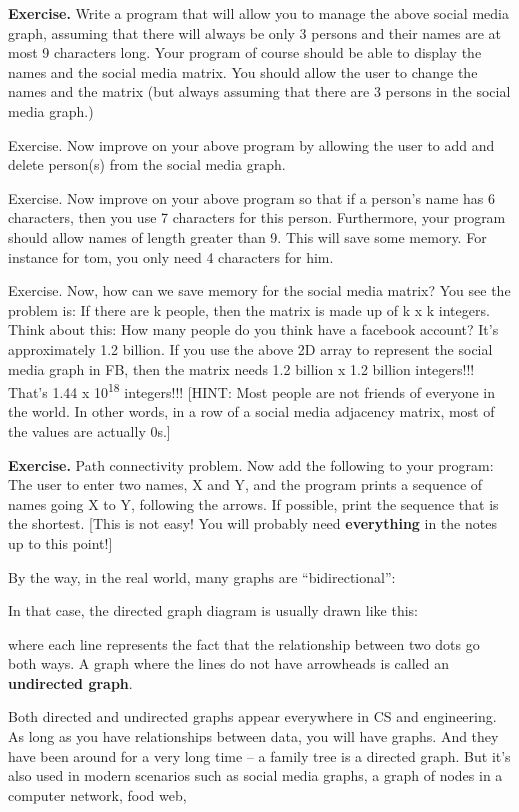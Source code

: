 \documentclass[
]{article}
\begin{document}
\textbf{Exercise.} Write a program that will allow you to manage the
above social media graph, assuming that there will always be only 3
persons and their names are at most 9 characters long. Your program of
course should be able to display the names and the social media matrix.
You should allow the user to change the names and the matrix (but always
assuming that there are 3 persons in the social media graph.)

Exercise. Now improve on your above program by allowing the user to add
and delete person(s) from the social media graph.

Exercise. Now improve on your above program so that if a person's name
has 6 characters, then you use 7 characters for this person.
Furthermore, your program should allow names of length greater than 9.
This will save some memory. For instance for tom, you only need 4
characters for him.

Exercise. Now, how can we save memory for the social media matrix? You
see the problem is: If there are k people, then the matrix is made up of
k x k integers. Think about this: How many people do you think have a
facebook account? It's approximately 1.2 billion. If you use the above
2D array to represent the social media graph in FB, then the matrix
needs 1.2 billion x 1.2 billion integers!!! That's 1.44 x
10\textsuperscript{18} integers!!! {[}HINT: Most people are not friends
of everyone in the world. In other words, in a row of a social media
adjacency matrix, most of the values are actually 0s.{]}

\textbf{Exercise.} Path connectivity problem. Now add the following to
your program: The user to enter two names, X and Y, and the program
prints a sequence of names going X to Y, following the arrows. If
possible, print the sequence that is the shortest. {[}This is not easy!
You will probably need \textbf{everything} in the notes up to this
point!{]}

By the way, in the real world, many graphs are ``bidirectional'':

In that case, the directed graph diagram is usually drawn like this:

where each line represents the fact that the relationship between two
dots go both ways. A graph where the lines do not have arrowheads is
called an \textbf{undirected graph}.

Both directed and undirected graphs appear everywhere in CS and
engineering. As long as you have relationships between data, you will
have graphs. And they have been around for a very long time -- a family
tree is a directed graph. But it's also used in modern scenarios such as
social media graphs, a graph of nodes in a computer network, food web,
\end{document}
